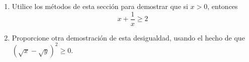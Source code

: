 \item 
\begin{enumerate}
        \item[(a)] Utilice los métodos de esta sección para demostrar que si $x > 0$, entonces
        $$x + \frac{1}{x} \ge 2$$
        \item[(b)] Proporcione otra demostración de esta desigualdad, usando el hecho de que $(\sqrt{x} - \sqrt{y})^2 \ge 0$.
    \end{enumerate}
